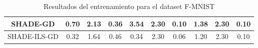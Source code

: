 \begin{table}[H]
{\begin{tabular}{|c|ccc|ccc|ccc|}
SHADE-GD                                          & \multicolumn{1}{c|}{0.70}          & \multicolumn{1}{c|}{2.13}          & 0.36          & \multicolumn{1}{c|}{3.54}          & \multicolumn{1}{c|}{2.30}          & 0.10          & \multicolumn{1}{c|}{1.38}          & \multicolumn{1}{c|}{2.30}          & 0.10          \\ \hline
SHADE-ILS-GD                                      & \multicolumn{1}{c|}{0.32}          & \multicolumn{1}{c|}{1.64}          & 0.46          & \multicolumn{1}{c|}{0.34}          & \multicolumn{1}{c|}{2.30}          & 0.06          & \multicolumn{1}{c|}{1.20}          & \multicolumn{1}{c|}{2.30}          & 0.10          \\ \hline
\end{tabular}}
\caption{Resultados del entrenamiento para el dataset F-MNIST}
\label{tab:fmnist}
\end{table}



